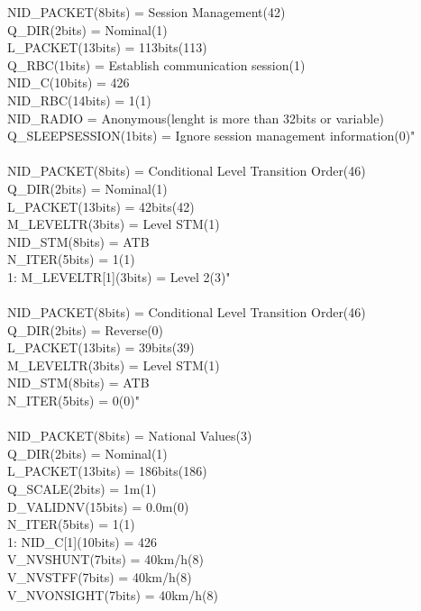 \documentclass{template/openetcs_article}
\begin{document}
\begin{table}[H]
  \footnotesize\sffamily
NID\_PACKET(8bits) = Session Management(42) \\
Q\_DIR(2bits) = Nominal(1) \\
L\_PACKET(13bits) = 113bits(113) \\
Q\_RBC(1bits) = Establish communication session(1) \\
NID\_C(10bits) = 426 \\
NID\_RBC(14bits) = 1(1) \\
    NID\_RADIO = Anonymous(lenght is more than 32bits or variable) \\
Q\_SLEEPSESSION(1bits) = Ignore session management information(0)" \\
\\
NID\_PACKET(8bits) = Conditional Level Transition Order(46) \\
Q\_DIR(2bits) = Nominal(1) \\
L\_PACKET(13bits) = 42bits(42) \\
M\_LEVELTR(3bits) = Level STM(1) \\
    NID\_STM(8bits) = ATB \\
N\_ITER(5bits) = 1(1) \\
    1: M\_LEVELTR[1](3bits) = Level 2(3)" \\
    \\
NID\_PACKET(8bits) = Conditional Level Transition Order(46) \\
Q\_DIR(2bits) = Reverse(0) \\
L\_PACKET(13bits) = 39bits(39) \\
M\_LEVELTR(3bits) = Level STM(1) \\
    NID\_STM(8bits) = ATB \\
N\_ITER(5bits) = 0(0)" \\
\\
NID\_PACKET(8bits) = National Values(3) \\
Q\_DIR(2bits) = Nominal(1) \\
L\_PACKET(13bits) = 186bits(186) \\
Q\_SCALE(2bits) = 1m(1) \\
D\_VALIDNV(15bits) = 0.0m(0) \\
N\_ITER(5bits) = 1(1) \\
    1: NID\_C[1](10bits) = 426 \\
V\_NVSHUNT(7bits) = 40km/h(8) \\
V\_NVSTFF(7bits) = 40km/h(8) \\
V\_NVONSIGHT(7bits) = 40km/h(8) \\

\end{table}
\end{document}
